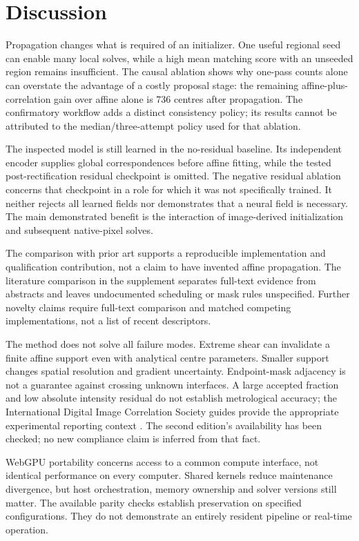 \documentclass[11pt,a4paper]{article}
\begin{document}
\section{Discussion}
Propagation changes what is required of an initializer. One useful regional seed can enable many local solves, while a high mean matching score with an unseeded region remains insufficient. The causal ablation shows why one-pass counts alone can overstate the advantage of a costly proposal stage: the remaining affine-plus-correlation gain over affine alone is 736 centres after propagation. The confirmatory workflow adds a distinct consistency policy; its results cannot be attributed to the median/three-attempt policy used for that ablation.

The inspected model is still learned in the no-residual baseline. Its independent encoder supplies global correspondences before affine fitting, while the tested post-rectification residual checkpoint is omitted. The negative residual ablation concerns that checkpoint in a role for which it was not specifically trained. It neither rejects all learned fields nor demonstrates that a neural field is necessary. The main demonstrated benefit is the interaction of image-derived initialization and subsequent native-pixel solves.

The comparison with prior art supports a reproducible implementation and qualification contribution, not a claim to have invented affine propagation. The literature comparison in the supplement separates full-text evidence from abstracts and leaves undocumented scheduling or mask rules unspecified. Further novelty claims require full-text comparison and matched competing implementations, not a list of recent descriptors.

The method does not solve all failure modes. Extreme shear can invalidate a finite affine support even with analytical centre parameters. Smaller support changes spatial resolution and gradient uncertainty. Endpoint-mask adjacency is not a guarantee against crossing unknown interfaces. A large accepted fraction and low absolute intensity residual do not establish metrological accuracy; the International Digital Image Correlation Society guides provide the appropriate experimental reporting context \citep{guide,guide2}. The second edition's availability has been checked; no new compliance claim is inferred from that fact.

WebGPU portability concerns access to a common compute interface, not identical performance on every computer. Shared kernels reduce maintenance divergence, but host orchestration, memory ownership and solver versions still matter. The available parity checks establish preservation on specified configurations. They do not demonstrate an entirely resident pipeline or real-time operation.
\end{document}
